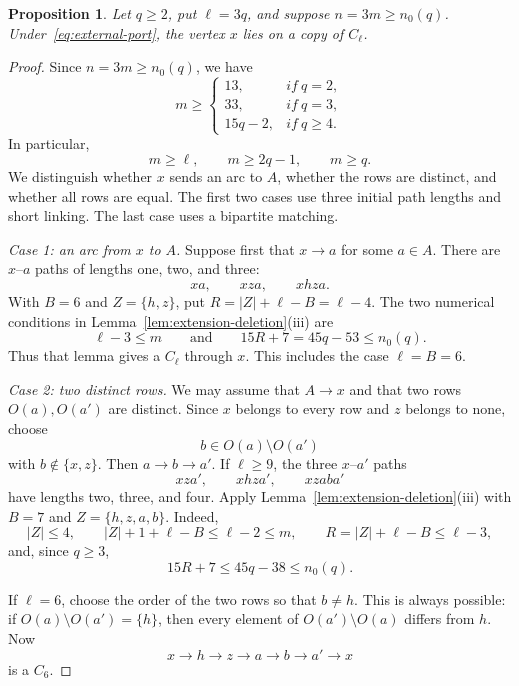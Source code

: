 \documentclass[11pt]{amsart}
\newtheorem{proposition}[theorem]{Proposition}
\theoremstyle{definition}
\begin{document}
\begin{proposition}\label{prop:second-port}
Let $q\ge2$, put $\ell=3q$, and suppose $n=3m\ge n_0(q)$.
Under~\eqref{eq:external-port}, the vertex $x$ lies on a copy of $C_\ell$.
\end{proposition}

\begin{proof}
Since $n=3m\ge n_0(q)$, we have
\[
  m\ge
  \begin{cases}
    13,&if~q=2,\\
    33,&if~q=3,\\
    15q-2,&if~q\ge4.
  \end{cases}
\]
In particular,
\begin{equation}\label{eq:second-port-numerics}
  m\ge\ell,\qquad m\ge2q-1,\qquad m\ge q.
\end{equation}
We distinguish whether $x$ sends an arc to $A$, whether the rows are
distinct, and whether all rows are equal.  The first two cases use three
initial path lengths and short linking.  The last case uses a bipartite
matching.

\smallskip
\noindent\emph{Case 1: an arc from $x$ to $A$.}
Suppose first that $x\to a$ for some $a\in A$.  There are $x$--$a$ paths of lengths one, two, and three:
\[
  xa,\qquad xza,\qquad xhza.
\]
With $B=6$ and $Z=\{h,z\}$, put
$R=|Z|+\ell-B=\ell-4$.  The two numerical conditions in
Lemma~\ref{lem:extension-deletion}(iii) are
\[
  \ell-3\le m
  \qquad\text{and}\qquad
  15R+7=45q-53\le n_0(q).
\]
Thus that lemma gives a $C_\ell$ through $x$.  This includes the case
$\ell=B=6$.

\smallskip
\noindent\emph{Case 2: two distinct rows.}
We may assume that $A\to x$ and that two rows $O(a),O(a')$ are
distinct.  Since $x$ belongs to every row and $z$ belongs to none, choose
\[
  b\in O(a)\setminus O(a')
\]
with $b\notin\{x,z\}$.  Then $a\to b\to a'$.  If $\ell\ge9$, the three $x$--$a'$ paths
\[
  xza',\qquad xhza',\qquad xzaba'
\]
have lengths two, three, and four.  Apply
Lemma~\ref{lem:extension-deletion}(iii) with $B=7$ and
$Z=\{h,z,a,b\}$.  Indeed,
\[
  |Z|\le4,\qquad |Z|+1+\ell-B\le\ell-2\le m,
  \qquad R=|Z|+\ell-B\le\ell-3,
\]
and, since $q\ge3$,
\[
  15R+7\le45q-38\le n_0(q).
\]

If $\ell=6$, choose the order of the two rows so that $b\ne h$.  This is always possible: if $O(a)\setminus O(a')=\{h\}$, then every element of $O(a')\setminus O(a)$ differs from $h$.  Now
\[
  x\to h\to z\to a\to b\to a'\to x
\]
is a $C_6$.


\end{proof}
\end{document}
